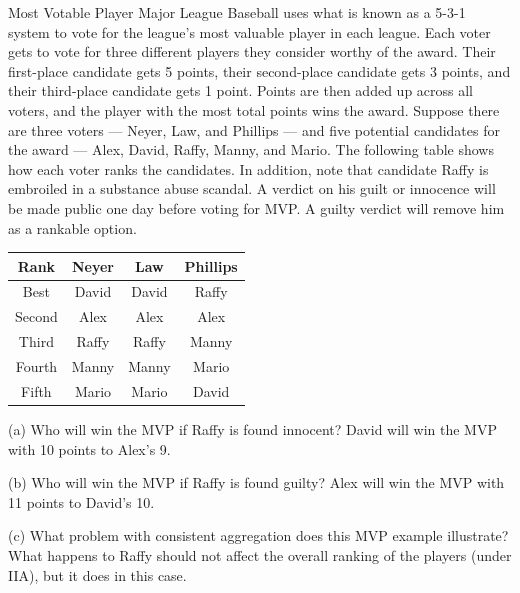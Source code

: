 \documentclass[8pt]{extarticle}
\title{}
\author{Avinash Iyer}
\date{}
\begin{document}
  \begin{problem}{Most Votable Player}
    Major League Baseball uses what is known as a 5-3-1 system to vote for the league's most valuable player in each league. Each voter gets to vote for three different players they consider worthy of the award. Their first-place candidate gets 5 points, their second-place candidate gets 3 points, and their third-place candidate gets 1 point. Points are then added up across all voters, and the player with the most total points wins the award. Suppose there are three voters --- Neyer, Law, and Phillips --- and five potential candidates for the award --- Alex, David, Raffy, Manny, and Mario. The following table shows how each voter ranks the candidates. In addition, note that candidate Raffy is embroiled in a substance abuse scandal. A verdict on his guilt or innocence will be made public one day before voting for MVP. A guilty verdict will remove him as a rankable option.
    \begin{center}
      \begin{tabular}{cccc}
        \hline \hline
        Rank & Neyer & Law & Phillips\\
        \hline
        Best & David & David & Raffy\\
        Second & Alex & Alex & Alex\\
        Third & Raffy & Raffy & Manny\\
        Fourth & Manny & Manny & Mario\\
        Fifth & Mario & Mario & David\\
        \hline \hline
      \end{tabular}
    \end{center}
    \tcblower
    \begin{problem}{(a)}
      Who will win the MVP if Raffy is found innocent?
      \tcblower
      David will win the MVP with 10 points to Alex's 9.
    \end{problem}
    \begin{problem}{(b)}
      Who will win the MVP if Raffy is found guilty?
      \tcblower
      Alex will win the MVP with 11 points to David's 10.
    \end{problem}
    \begin{problem}{(c)}
      What problem with consistent aggregation does this MVP example illustrate?
      \tcblower
      What happens to Raffy should not affect the overall ranking of the players (under IIA), but it does in this case.
    \end{problem}
  \end{problem}
\end{document}
